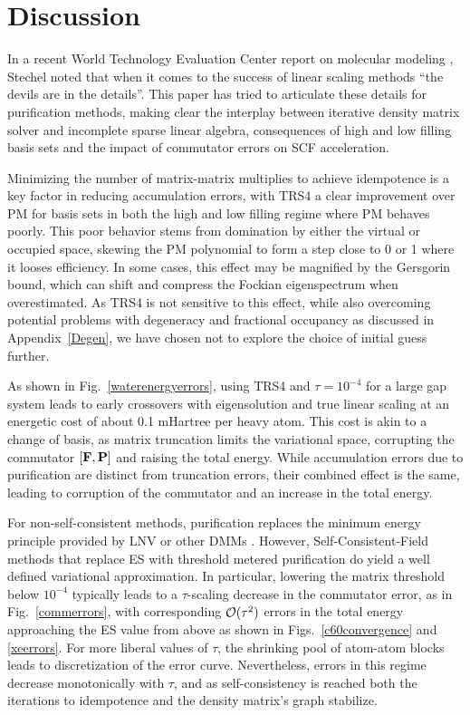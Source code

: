 \commentoutA{\documentclass[prb,aps,twocolumn,showpacs,twocolumngrid,superbib]{revtex4}}
\begin{document}
\section{Discussion}\label{discuss}

In a recent World Technology Evaluation Center report on molecular modeling \cite{WTECMM02}, 
Stechel noted that when it comes to the success of linear scaling  methods 
``the devils are in the details''.  This paper has tried to articulate these details for
purification methods, making clear the interplay between iterative density matrix solver and
incomplete sparse linear algebra, consequences of high and low filling basis sets and the 
impact of commutator errors on SCF acceleration. 

Minimizing the number of matrix-matrix multiplies to achieve idempotence is a key factor in reducing
accumulation errors, with TRS4 a clear improvement over PM for basis sets in both the high and 
low filling regime where PM behaves poorly.  This poor behavior stems from domination by 
either the virtual or occupied space, skewing the PM polynomial to form a step close to 0
or 1 where it looses efficiency.  In some cases, this effect may be magnified by the 
Gersgorin bound, which can shift and compress the Fockian eigenspectrum when overestimated.  As
TRS4 is not sensitive to this effect, while also overcoming potential problems with 
degeneracy and fractional occupancy as discussed in Appendix~\ref{Degen}, we have chosen not
to explore the choice of initial guess further.

As shown in Fig.~\ref{waterenergyerrors}, using TRS4 and $\tau=10^{-4}$ for a large gap system 
leads to  early crossovers with eigensolution and true linear scaling at an energetic 
cost of about 0.1 mHartree per heavy atom.  This cost is akin to a change of basis, 
as matrix truncation limits the variational space, corrupting the commutator $[{\bf F,P}]$ and 
raising the total energy.  While accumulation errors due to purification are distinct from 
truncation errors, their combined effect is the same, leading to corruption of the commutator 
and an increase in the total energy.   

For non-self-consistent methods,  purification replaces the minimum energy 
principle provided by LNV or other DMMs \cite{APalser98,DBowler99}.  However, Self-Consistent-Field methods 
that replace ES with threshold metered purification do yield a well defined variational approximation.  In particular, 
lowering the matrix threshold below $10^{-4}$ typically leads to a $\tau$-scaling decrease in the commutator 
error, as in Fig.~\ref{commerrors}, with corresponding ${\cal O}(\tau^2)$ errors in the total energy 
approaching  the ES value from above as shown in Figs.~\ref{c60convergence} and \ref{xeerrors}.  For more liberal  
values of $\tau$, the shrinking pool of atom-atom blocks leads to discretization of the error curve.  
Nevertheless, errors in this regime decrease monotonically with $\tau$, and as self-consistency 
is reached both the iterations to idempotence and the density matrix's graph stabilize.
\end{document}
